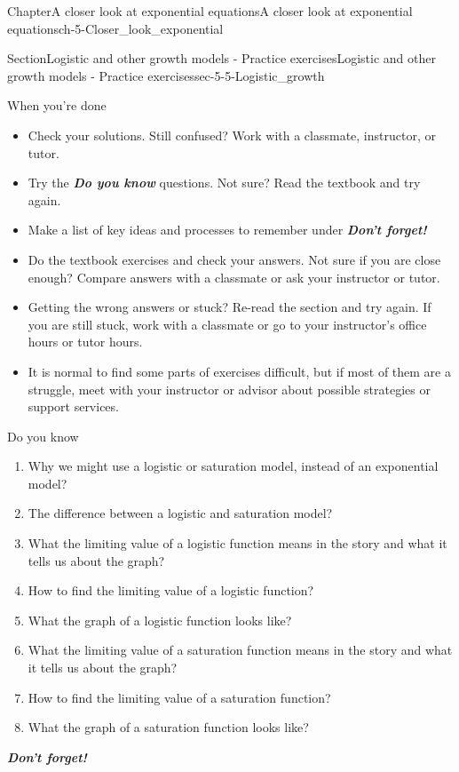 \documentclass[twoside,11pt,]{book}
\newcommand{\alert}[1]{\textbf{\textit{#1}}}
\numberwithin{equation}{section}
\begin{document}
\begin{chapterptx}{Chapter}{A closer look at exponential equations}{}{A closer look at exponential equations}{}{}{ch-5-Closer_look_exponential}
\begin{sectionptx}{Section}{Logistic and other growth models - Practice exercises}{}{Logistic and other growth models - Practice exercises}{}{}{sec-5-5-Logistic_growth}
\begin{conclusion}{When you're done \textellipsis{}}%
%
\begin{itemize}[label=\textbullet]
\item{}Check your solutions. Still confused? Work with a classmate, instructor, or tutor.%
\item{}Try the \alert{Do you know} questions. Not sure? Read the textbook and try again.%
\item{}Make a list of key ideas and processes to remember under \alert{Don't forget!}%
\item{}Do the textbook exercises and check your answers. Not sure if you are close enough? Compare answers with a classmate or ask your instructor or tutor.%
\item{}Getting the wrong answers or stuck? Re-read the section and try again. If you are still stuck, work with a classmate or go to your instructor's office hours or tutor hours.%
\item{}It is normal to find some parts of exercises difficult, but if most of them are a struggle, meet with your instructor or advisor about possible strategies or support services.%
\end{itemize}
%
\end{conclusion}%
\begin{conclusion}{Do you know \textellipsis{}}%
%
\begin{enumerate}[label={\Alph*.}]
\item{}Why we might use a logistic or saturation model, instead of an exponential model?%
\item{}The difference between a logistic and saturation model?%
\item{}What the limiting value of a logistic function means in the story and what it tells us about the graph?%
\item{}How to find the limiting value of a logistic function?%
\item{}What the graph of a logistic function looks like?%
\item{}What the limiting value of a saturation function means in the story and what it tells us about the graph?%
\item{}How to find the limiting value of a saturation function?%
\item{}What the graph of a saturation function looks like?%
\end{enumerate}
%
\par
\alert{Don't forget!}%
\end{conclusion}%

\end{sectionptx}
\end{chapterptx}
\end{document}
